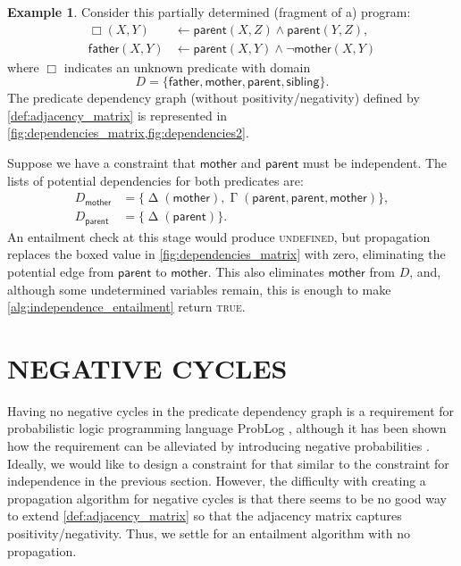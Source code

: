 \documentclass[letterpaper]{article}
\theoremstyle{definition}
\newtheorem{example}{Example}
\DeclareMathOperator{\Determined}{\Delta}
\DeclareMathOperator{\AlmostDetermined}{\Gamma}
\begin{document}
\begin{example} \label{example:independence}
  Consider this partially determined (fragment of a) program:
  \begin{align*}
    \Box(X, Y) &\gets \mathsf{parent}(X, Z) \land \mathsf{parent}(Y, Z),\\
    \mathsf{father}(X, Y) &\gets \mathsf{parent}(X, Y) \land \neg\mathsf{mother}(X, Y)
  \end{align*}
  where $\Box$ indicates an unknown predicate with domain
  \[
    D = \{ \mathsf{father}, \mathsf{mother}, \mathsf{parent}, \mathsf{sibling}
    \}.
  \]
  The predicate dependency graph (without positivity/negativity) defined by
  \cref{def:adjacency_matrix} is represented in
  \cref{fig:dependencies_matrix,fig:dependencies2}.

  Suppose we have a constraint that $\mathsf{mother}$ and $\mathsf{parent}$ must
  be independent. The lists of potential dependencies for both predicates are:
  \begin{align*}
    D_{\mathsf{mother}} &= \{ \Determined(\mathsf{mother}), \AlmostDetermined(\mathsf{parent}, \mathsf{parent}, \mathsf{mother}) \}, \\
    D_{\mathsf{parent}} &= \{ \Determined(\mathsf{parent}) \}.
  \end{align*}
  An entailment check at this stage would produce \textsc{undefined}, but
  propagation replaces the boxed value in \cref{fig:dependencies_matrix} with
  zero, eliminating the potential edge from $\mathsf{parent}$ to
  $\mathsf{mother}$. This also eliminates $\mathsf{mother}$ from $D$, and,
  although some undetermined variables remain, this is enough to make
  \cref{alg:independence_entailment} return \textsc{true}.
\end{example}

\section{NEGATIVE CYCLES} \label{sec:cycles}

Having no negative cycles in the predicate dependency graph is a requirement for
probabilistic logic programming language ProbLog \citep{kimmig2009trading},
although it has been shown how the requirement can be alleviated by introducing
negative probabilities \citep{DBLP:journals/ijar/BuchmanP17}. Ideally, we would
like to design a constraint for that similar to the constraint for independence
in the previous section. However, the difficulty with creating a propagation
algorithm for negative cycles is that there seems to be no good way to extend
\cref{def:adjacency_matrix} so that the adjacency matrix captures
positivity/negativity. Thus, we settle for an entailment algorithm with no
propagation.
\end{document}
